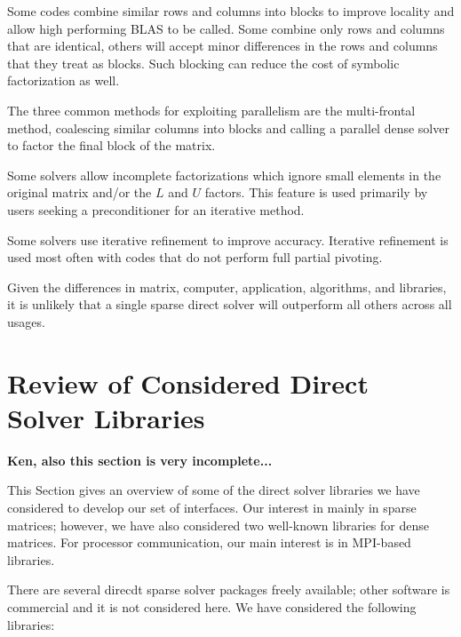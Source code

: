 \documentclass[acmtocl]{acmtrans2m}
\begin{document}
Some codes combine similar rows and columns into blocks to improve
locality and allow high performing BLAS to be called.  Some combine
only rows and columns that are identical, others will accept minor
differences in the rows and columns that they treat as blocks.  Such
blocking can reduce the cost of symbolic factorization as well.

The three common methods for exploiting parallelism are the
multi-frontal method, coalescing  similar 
columns into blocks and calling a parallel dense solver 
to factor the final block of the matrix.

Some solvers allow incomplete factorizations which ignore small
elements in the original matrix and/or the $L$ and $U$ factors.
This feature is used primarily by users seeking a
preconditioner for an iterative method.

Some solvers use iterative refinement to improve accuracy.  Iterative
refinement is used most often with codes that do not perform full partial pivoting.  

Given the differences in matrix, computer, application, algorithms,
and libraries, it is unlikely that a single sparse direct solver will 
outperform all others across all usages.  





\section{Review of Considered Direct Solver Libraries}
\label{sec:review}

{\bf Ken, also this section is very incomplete...}
\bigskip

This Section gives an overview of some of the direct solver libraries
we have considered to develop our set of interfaces.
Our interest in mainly in sparse matrices; however, we have also considered
two well-known libraries for dense matrices. For processor communication, our
main interest is in MPI-based libraries.

There are several direcdt sparse solver packages freely available; other
software is commercial and it is not considered here. We have considered the
following libraries:
\end{document}
